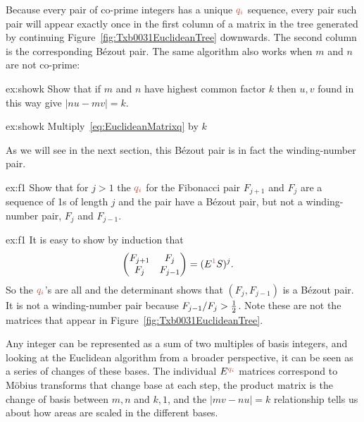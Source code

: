 
Because every pair of co-prime integers has a unique $\jqi$ sequence, every pair such pair will appear exactly once in the first column of a matrix in the tree generated by continuing Figure~\ref{fig:Txb0031EuclideanTree} downwards.
The second column is the corresponding B\'ezout pair. The same algorithm also works when $m$ and $n$ are not co-prime:
\begin{jExercise}{ex:showk}
	Show that if $m$ and $n$ have highest common factor $k$ then $u,v$ found in this way give $|nu-mv|=k$.
\end{jExercise}
\begin{jAnswer}{ex:showk}
	Multiply~\eqref{eq:EuclideanMatrixq} by $k$
\end{jAnswer}
As we will see in the next section, this B\'ezout pair is in fact the winding-number pair.

\begin{jExercise}{ex:f1}
	Show that for $j>1$ the  $\jqi$ for the Fibonacci pair $F_{j+1}$ and $F_j$ are a sequence of 1s of length $j$ and 
	the pair have a B\'ezout pair, but not a winding-number pair,  $F_j$ and $F_{j-1}$.
\end{jExercise}
\begin{jAnswer}{ex:f1}
		It is easy to show by induction that 
\begin{align}
	\begin{pmatrix} 
		F_{j+1} & F_{j} 
		\\
		F _j & F_{j-1}
	\end{pmatrix} &= 	(E^\jqn{1} S)^{j}.
	\label{eq:FibonacciMatrixB}
\end{align}
So the  $\jqi$'s are all  and the determinant shows that $(F_{j},F_{j-1})$ is a B\'ezout pair. It is not a winding-number pair because $F_{j-1}/F_j>\textstyle{\frac{1}{2}}$. Note these are not the matrices that appear in Figure~\ref{fig:Txb0031EuclideanTree}.
\end{jAnswer}

Any integer can be represented as a sum of two multiples of basis integers, and looking at the Euclidean algorithm from a broader perspective, it can  be seen as a series of changes of these bases.  The individual $E^{\jqi}$ matrices correspond to  M\"obius transforms that change base at each step, the product matrix is the change of basis between $m,n$ and $k,1$, and the $ |mv - nu|=k$ relationship tells us about how areas are scaled in the different bases. 

